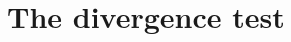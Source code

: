 \documentclass{ximera}
\begin{document}
\section{The divergence test}
%
%
%
%
%
%
%
%
\end{document}
